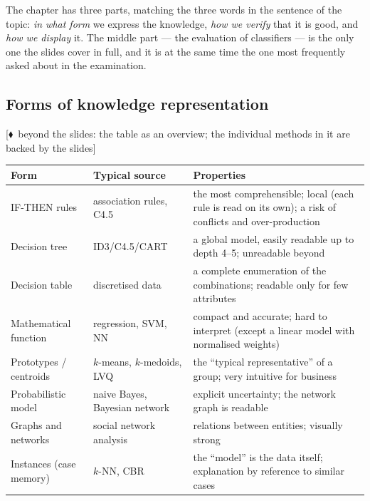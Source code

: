 \documentclass[11pt,a4paper]{article}
\theoremstyle{definition}
\providecommand{\uv}[1]{``#1''}
\newcommand{\mimoq}[1]{\textcolor{markcol}{\textsf{\footnotesize[$\blacklozenge$~beyond the slides: #1]}}}
\begin{document}
The chapter has three parts, matching the three words in the sentence of the topic: \emph{in what
form} we express the knowledge, \emph{how we verify} that it is good, and \emph{how we display} it.
The middle part --- the evaluation of classifiers --- is the only one the slides cover in full,
and it is at the same time the one most frequently asked about in the examination.

\subsection{Forms of knowledge representation}

\mimoq{the table as an overview; the individual methods in it are backed by the slides}
\begin{center}
\small
\begin{tabular}{@{}p{3.4cm}p{4.4cm}p{7.0cm}@{}}
\toprule
\textbf{Form} & \textbf{Typical source} & \textbf{Properties} \\
\midrule
IF-THEN rules & association rules, C4.5 & the most comprehensible; local (each rule is read on its
  own); a risk of conflicts and over-production \\
Decision tree & ID3/C4.5/CART & a global model, easily readable up to depth 4--5; unreadable
  beyond \\
Decision table & discretised data & a complete enumeration of the combinations; readable only for
  few attributes \\
Mathematical function & regression, SVM, NN & compact and accurate; hard to interpret (except a
  linear model with normalised weights) \\
Prototypes / centroids & $k$-means, $k$-medoids, LVQ & the \uv{typical representative} of a group;
  very intuitive for business \\
Probabilistic model & naive Bayes, Bayesian network & explicit uncertainty; the network graph is
  readable \\
Graphs and networks & social network analysis & relations between entities; visually strong \\
Instances (case memory) & $k$-NN, CBR & the \uv{model} is the data itself; explanation by reference
  to similar cases \\
\bottomrule
\end{tabular}
\end{center}
\end{document}
